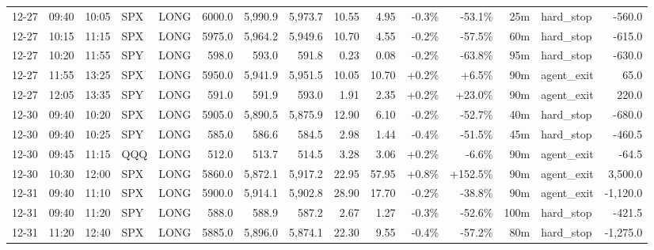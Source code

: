 \documentclass[11pt,a4paper,twoside]{article}
\begin{document}
\begin{landscape}
\begin{center}
\begin{longtable}{>{\color{txtmain}}l l l l l r r r r r r r r >{\color{txtmain}}l r}
12-27 & 09:40 & 10:05 & SPX & LONG & 6000.0 & 5,990.9 & 5,973.7 & 10.55 & 4.95 & \textcolor{lossred}{-0.3\%} & \textcolor{lossred}{-53.1\%} & 25m & hard\_stop & \textcolor{lossred}{-560.0} \\
12-27 & 10:15 & 11:15 & SPX & LONG & 5975.0 & 5,964.2 & 5,949.6 & 10.70 & 4.55 & \textcolor{lossred}{-0.2\%} & \textcolor{lossred}{-57.5\%} & 60m & hard\_stop & \textcolor{lossred}{-615.0} \\
12-27 & 10:20 & 11:55 & SPY & LONG & 598.0 & 593.0 & 591.8 & 0.23 & 0.08 & \textcolor{lossred}{-0.2\%} & \textcolor{lossred}{-63.8\%} & 95m & hard\_stop & \textcolor{lossred}{-630.0} \\
12-27 & 11:55 & 13:25 & SPX & LONG & 5950.0 & 5,941.9 & 5,951.5 & 10.05 & 10.70 & \textcolor{wingreen}{+0.2\%} & \textcolor{wingreen}{+6.5\%} & 90m & agent\_exit & \textcolor{wingreen}{65.0} \\
12-27 & 12:05 & 13:35 & SPY & LONG & 591.0 & 591.9 & 593.0 & 1.91 & 2.35 & \textcolor{wingreen}{+0.2\%} & \textcolor{wingreen}{+23.0\%} & 90m & agent\_exit & \textcolor{wingreen}{220.0} \\
12-30 & 09:40 & 10:20 & SPX & LONG & 5905.0 & 5,890.5 & 5,875.9 & 12.90 & 6.10 & \textcolor{lossred}{-0.2\%} & \textcolor{lossred}{-52.7\%} & 40m & hard\_stop & \textcolor{lossred}{-680.0} \\
12-30 & 09:40 & 10:25 & SPY & LONG & 585.0 & 586.6 & 584.5 & 2.98 & 1.44 & \textcolor{lossred}{-0.4\%} & \textcolor{lossred}{-51.5\%} & 45m & hard\_stop & \textcolor{lossred}{-460.5} \\
12-30 & 09:45 & 11:15 & QQQ & LONG & 512.0 & 513.7 & 514.5 & 3.28 & 3.06 & \textcolor{wingreen}{+0.2\%} & \textcolor{lossred}{-6.6\%} & 90m & agent\_exit & \textcolor{lossred}{-64.5} \\
12-30 & 10:30 & 12:00 & SPX & LONG & 5860.0 & 5,872.1 & 5,917.2 & 22.95 & 57.95 & \textcolor{wingreen}{+0.8\%} & \textcolor{wingreen}{+152.5\%} & 90m & agent\_exit & \textcolor{wingreen}{3,500.0} \\
12-31 & 09:40 & 11:10 & SPX & LONG & 5900.0 & 5,914.1 & 5,902.8 & 28.90 & 17.70 & \textcolor{lossred}{-0.2\%} & \textcolor{lossred}{-38.8\%} & 90m & agent\_exit & \textcolor{lossred}{-1,120.0} \\
12-31 & 09:40 & 11:20 & SPY & LONG & 588.0 & 588.9 & 587.2 & 2.67 & 1.27 & \textcolor{lossred}{-0.3\%} & \textcolor{lossred}{-52.6\%} & 100m & hard\_stop & \textcolor{lossred}{-421.5} \\
12-31 & 11:20 & 12:40 & SPX & LONG & 5885.0 & 5,896.0 & 5,874.1 & 22.30 & 9.55 & \textcolor{lossred}{-0.4\%} & \textcolor{lossred}{-57.2\%} & 80m & hard\_stop & \textcolor{lossred}{-1,275.0} \\

\end{longtable}
\end{center}
\end{landscape}
\end{document}
